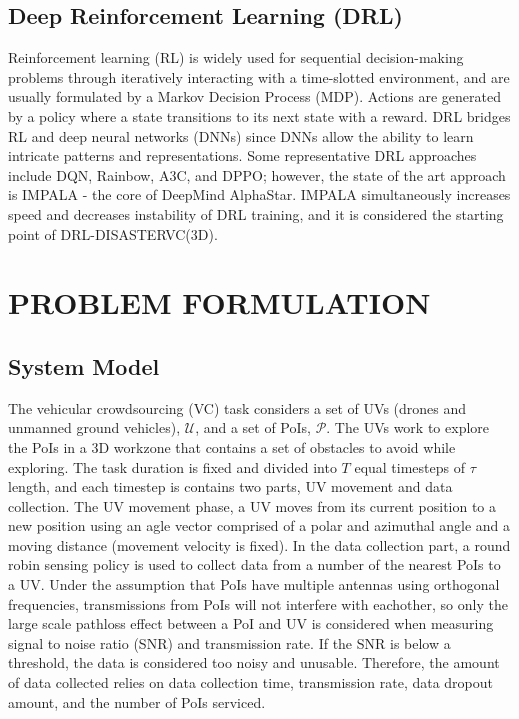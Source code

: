 \documentclass[sigconf, natbib=false]{acmart}
\newcommand{\UV}{\mathcal{U}}
\newcommand{\PoI}{\mathcal{P}}
\begin{document}
   \subsection{Deep Reinforcement Learning (DRL)}
   Reinforcement learning (RL) is widely used for sequential decision-making problems through iteratively interacting with a time-slotted environment, and are usually formulated by a Markov Decision Process (MDP). Actions are generated by a policy where a state transitions to its next state with a reward. DRL bridges RL and deep neural networks (DNNs) since DNNs allow the ability to learn intricate patterns and representations. Some representative DRL approaches include DQN, Rainbow, A3C, and DPPO; however, the state of the art approach is IMPALA - the core of DeepMind AlphaStar. IMPALA simultaneously increases speed and decreases instability of DRL training, and it is considered the starting point of DRL-DISASTERVC(3D).

   \section{PROBLEM FORMULATION}
   \subsection{System Model}
   The vehicular crowdsourcing (VC) task considers a set of UVs (drones and unmanned ground vehicles), $\UV$, and a set of PoIs, $\PoI$. The UVs work to explore the PoIs in a 3D workzone that contains a set of obstacles to avoid while exploring. The task duration is fixed and divided into $T$ equal timesteps of $\tau$ length, and each timestep is contains two parts, UV movement and data collection. The UV movement phase, a UV moves from its current position to a new position using an agle vector comprised of a polar and azimuthal angle and a moving distance (movement velocity is fixed). In the data collection part, a round robin sensing policy is used to collect data from a number of the nearest PoIs to a UV. Under the assumption that PoIs have multiple antennas using orthogonal frequencies, transmissions from PoIs will not interfere with eachother, so only the large scale pathloss effect between a PoI and UV is considered when measuring signal to noise ratio (SNR) and transmission rate. If the SNR is below a threshold, the data is considered too noisy and unusable. Therefore, the amount of data collected relies on data collection time, transmission rate, data dropout amount, and the number of PoIs serviced.
\end{document}
